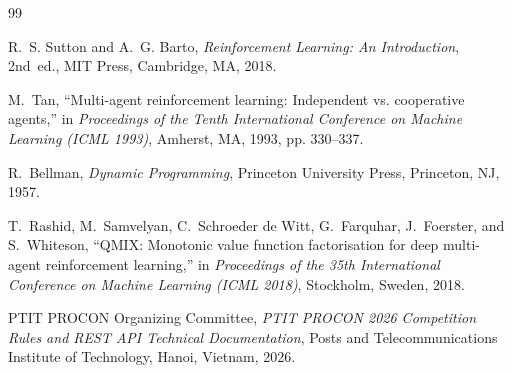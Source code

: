 \documentclass[11pt,a4paper]{article}
\begin{document}
\begin{thebibliography}{99}

R.~S. Sutton and A.~G. Barto, \emph{Reinforcement Learning: An Introduction}, 2nd~ed., MIT Press, Cambridge, MA, 2018.

M.~Tan, ``Multi-agent reinforcement learning: Independent vs. cooperative agents,'' in \emph{Proceedings of the Tenth International Conference on Machine Learning (ICML 1993)}, Amherst, MA, 1993, pp. 330--337.

R.~Bellman, \emph{Dynamic Programming}, Princeton University Press, Princeton, NJ, 1957.

T.~Rashid, M.~Samvelyan, C.~Schroeder de Witt, G.~Farquhar, J.~Foerster, and S.~Whiteson, ``QMIX: Monotonic value function factorisation for deep multi-agent reinforcement learning,'' in \emph{Proceedings of the 35th International Conference on Machine Learning (ICML 2018)}, Stockholm, Sweden, 2018.

PTIT PROCON Organizing Committee, \emph{PTIT PROCON 2026 Competition Rules and REST API Technical Documentation}, Posts and Telecommunications Institute of Technology, Hanoi, Vietnam, 2026.

\end{thebibliography}
\end{document}
